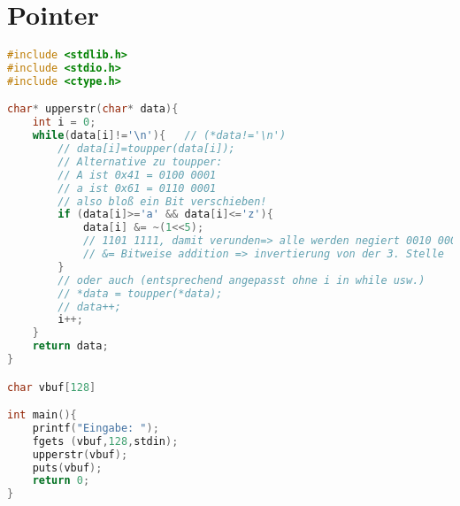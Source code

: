 \section{Pointer}

\begin{lstlisting}[language=C]
#include <stdlib.h>
#include <stdio.h>
#include <ctype.h>

char* upperstr(char* data){
	int i = 0;	
	while(data[i]!='\n'){	// (*data!='\n')
		// data[i]=toupper(data[i]);
		// Alternative zu toupper: 
		// A ist 0x41 = 0100 0001
		// a ist 0x61 = 0110 0001
		// also bloß ein Bit verschieben!
		if (data[i]>='a' && data[i]<='z'){
			data[i] &= ~(1<<5); 
			// 1101 1111, damit verunden=> alle werden negiert 0010 0000
			// &= Bitweise addition => invertierung von der 3. Stelle
		}
		// oder auch (entsprechend angepasst ohne i in while usw.)
		// *data = toupper(*data);
		// data++;
		i++;
	}
	return data;
}

char vbuf[128]

int main(){
	printf("Eingabe: ");
	fgets (vbuf,128,stdin);
	upperstr(vbuf);
	puts(vbuf);
	return 0;
}

\end{lstlisting}

\newpage
